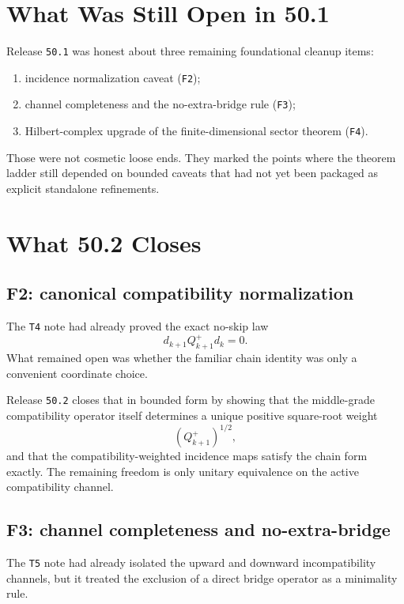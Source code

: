 \documentclass[11pt]{article}
\begin{document}
\section{What Was Still Open in 50.1}

Release \texttt{50.1} was honest about three remaining foundational cleanup items:
\begin{enumerate}
\item incidence normalization caveat (\texttt{F2});
\item channel completeness and the no-extra-bridge rule (\texttt{F3});
\item Hilbert-complex upgrade of the finite-dimensional sector theorem (\texttt{F4}).
\end{enumerate}

Those were not cosmetic loose ends. They marked the points where the theorem ladder still depended on bounded caveats that had not yet been packaged as explicit standalone refinements.

\section{What 50.2 Closes}

\subsection{F2: canonical compatibility normalization}

The \texttt{T4} note had already proved the exact no-skip law
\[
d_{k+1}Q_{k+1}^+d_k=0.
\]
What remained open was whether the familiar chain identity was only a convenient coordinate choice.

Release \texttt{50.2} closes that in bounded form by showing that the middle-grade compatibility operator itself determines a unique positive square-root weight
\[
(Q_{k+1}^+)^{1/2},
\]
and that the compatibility-weighted incidence maps satisfy the chain form exactly. The remaining freedom is only unitary equivalence on the active compatibility channel.

\subsection{F3: channel completeness and no-extra-bridge}

The \texttt{T5} note had already isolated the upward and downward incompatibility channels, but it treated the exclusion of a direct bridge operator as a minimality rule.
\end{document}
